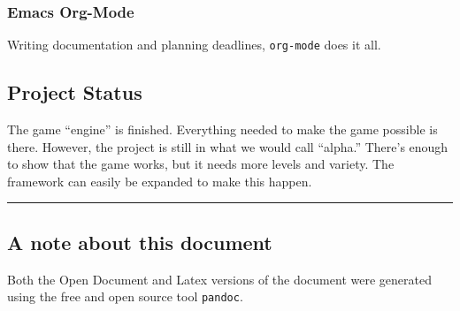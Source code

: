 \documentclass[11pt]{article}
\begin{document}
\subsubsection*{Emacs Org-Mode}
\label{sec:org3b6ce2e}
Writing documentation and planning deadlines, \texttt{org-mode} does it all.\\

\subsection{Project Status}
\label{sec:orge1c23ee}
The game ``engine'' is finished. Everything needed to make the game possible is there. However, the project is still in what we would call ``alpha.'' There's enough to show that the game works, but it needs more levels and variety. The framework can easily be expanded to make this happen.\\

\noindent\rule{\textwidth}{0.5pt}
\subsection{A note about this document}
\label{sec:orgd81ca28}
Both the Open Document and Latex versions of the document were generated using the free and open source tool \texttt{pandoc}.\\
\end{document}
